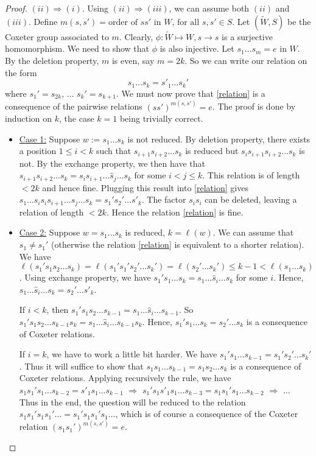 \documentclass[envcountsame,envcountchap]{svmono}
\begin{document}
\begin{proof}
$(ii) \Rightarrow (i)$. Using $(ii) \Rightarrow (iii)$, we can assume both $(ii)$ and $(iii)$. Define $m(s,s') = \text{order of $ss'$ in $W$, for all $s,s' \in S$}$. Let $(\tilde{W}, S)$ be the Coxeter group associated to $m$. Clearly, $\phi: \tilde{W} \mapsto W, s \to s$ is a surjective homomorphism. We need to show that $\phi$ is also injective. Let $s_1 \ldots s_m = e$ in $W$. By the deletion property, $m$ is even, say $m=2k$. So we can write our relation on the form
\begin{equation}
s_1 \ldots s_k = s'_1 \ldots s_k'
\label{relation}
\end{equation} where $s_1' = s_{2k}$, $\ldots$ $s_k' = s_{k+1}$. We must now prove that \eqref{relation} is a consequence of the pairwise relations $(ss')^{m(s,s')} = e$. The proof is done by induction on $k$, the case $k = 1$ being trivially correct. 
\begin{itemize}
\item \underline{Case 1:} Suppose $w := s_1 \ldots s_k$ is not reduced. By deletion property, there exists a position $1 \le i <k$ such that $s_{i+1} s_{i+2} \ldots s_k$ is reduced but $s_i s_{i+1} s_{i+2} ...s_k$ is not. By the exchange property, we then have that $s_{i+1} s_{i+2} \ldots s_k = s_i s_{i+1} \ldots \hat{s}_j \ldots s_k$ for some $i < j \le k$. This relation is of length $<2k$ and hence fine. Plugging this result into \eqref{relation} gives $s_1 \ldots s_i s_i s_{i+1} \ldots \hat{s}_j \ldots s_k = s_1' s_2' \ldots s'_k$. The factor $s_i s_i$ can be deleted, leaving a relation of length $<2k$. Hence the relation \eqref{relation} is fine. 
\item \underline{Case 2:} Suppose $w = s_1 \ldots s_k$ is reduced, $k = \ell (w)$. We can assume that $s_1 \neq s_1'$ (otherwise the relation \eqref{relation} is equivalent to a shorter relation). We have $\ell (s_1' s_1 s_2 \ldots s_k) = \ell (s_1' s_1' s_2' \ldots s_k') = \ell( s_2' \ldots s_k')  \le k-1 < \ell (s_1 \ldots s_k)$. Using exchange property, we have $s_1' s_1 \ldots s_k = s_1 \ldots \hat{s}_i \ldots s_k$ for some $i$. Hence, $s_1 \ldots \hat{s}_i \ldots s_k = s_2' \ldots s'_k$. 

If $i<k$, then $s_1' s_1 s_2 \ldots s_{k-1} = s_1 \ldots \hat{s}_i \ldots s_{k-1}$. So $s_1' s_1 s_2 \ldots s_{k-1} s_k = s_1 \ldots \hat{s}_i \ldots s_{k-1} s_k$. Hence, $s_1' s_1 \ldots s_k = s_2' \ldots s_k$ is a consequence of Coxeter relations.  

If $i=k$, we have to work a little bit harder. We have $s_1' s_1 \ldots s_{k-1} = s_1' s_2' \ldots s_k' $. Thus it will suffice to show that $s_1 s_1 \ldots s_{k-1} = s_1 s_2 \ldots s_k$ is a consequence of Coxeter relations. Applying recursively the rule, we have $s_1 s_1' s_1 \ldots s_{k-2} = s'_1 s_1 \ldots s_{k-1}$ $\Rightarrow$ $s_1' s_1 s'_1 s_1 \ldots s_{k-3} = s_1 s_1' s_1 \ldots s_{k-2}$ $\Rightarrow$ $\ldots$ Thus in the end, the question will be reduced to the relation $s_1 s_1' s_1 s_1' \ldots = s_1' s_1 s_1' s_1 \ldots$, which is of course a consequence of the Coxeter relation $(s_1 s_1')^{m(s,s')}= e$. 


\end{itemize}

\end{proof}
\end{document}
